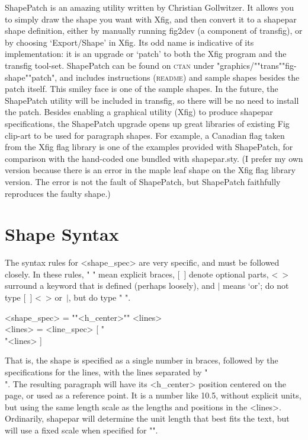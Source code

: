 \documentclass[draft]{article}
\makeatletter
\DeclareRobustCommand{\_}{%
  \ifmmode \nfss@text{\textunderscore}\else \BreakableUnderscore \fi}
\makeatother
\begin{document}
\shapepar\faceshape
ShapePatch is an amazing utility written by Christian Gollwitzer.  It
allows you to simply draw the shape you want with Xfig, and then
convert it to a shapepar shape definition, either by manually running
fig2dev (a component of transfig), or by choosing `Export/Shape' in
Xfig.  Its odd name is indicative of its implementation: it is an
upgrade or `patch' to both the Xfig program and the transfig tool-set.
ShapePatch can be found on \textsc{ctan} under
"graphics/""trans""fig-shape""patch", and includes instructions
(\textsc{readme}) and sample shapes besides the patch itself.  This
smiley face is one of the sample shapes.  In the future, the
ShapePatch utility will be included in transfig, so there will be no
need to install the patch.  Besides enabling a graphical utility
(Xfig) to produce shapepar specifications, the ShapePatch upgrade
opens up great libraries of existing Fig clip-art to be used for
paragraph shapes.  For example, a Canadian flag taken from the Xfig
flag library is one of the examples provided with ShapePatch, for
comparison with the hand-coded one bundled with shapepar.sty. (I
prefer my own version because there is an error in the maple leaf
shape on the Xfig flag library version.  The error is not the fault of
ShapePatch, but ShapePatch faithfully reproduces the faulty shape.)




\section{Shape Syntax}

The syntax rules for <shape_spec> are very specific, and must be
followed closely.  In these rules, "{ }" mean explicit braces, [~]
denote optional parts, <~> surround a keyword that is defined (perhaps
loosely), and $|$ means `or'; do not type [~] <~> or~$|$, but do type "{ }".

\begin{flushleft}
<shape_spec> = "{"<h_center>"}" <lines>  \\[\topsep]
<lines> = <line_spec> [ "\\"<lines> ]
\end{flushleft}

That is, the shape is specified as a single number in braces, followed
by the specifications for the lines, with the lines separated by "\\". The
resulting paragraph will have its <h_center> position centered on the page,
or used as a reference point.  It is a number like 10.5, without explicit
units, but using the same length scale as the
lengths and positions in the <lines>.  Ordinarily, shapepar will
determine the unit length that best fits the text, but will use
a fixed scale when specified for "\shapepar".
\end{document}
